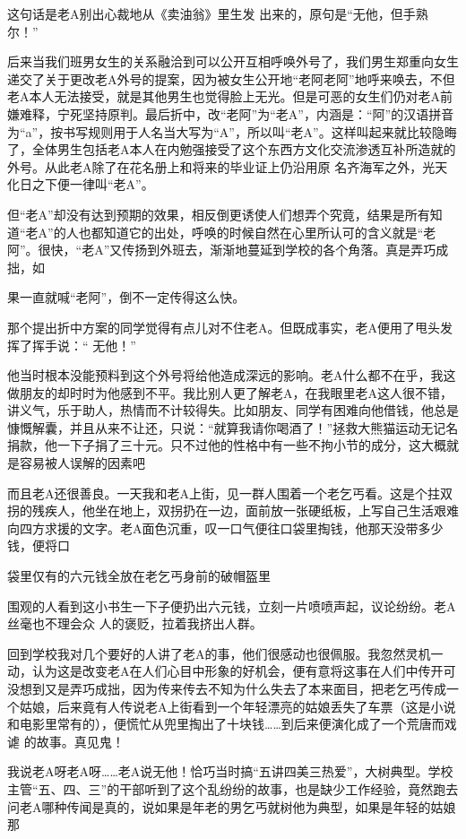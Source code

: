 \documentclass{article}
\begin{document}
这句话是老A别出心裁地从《卖油翁》里生发
出来的，原句是“无他，但手熟尔！” 

后来当我们班男女生的关系融洽到可以公开互相呼唤外号了，我们男生郑重向女生递交了关于更改老A外号的提案，因为被女生公开地“老阿老阿”地呼来唤去，不但老A本人无法接受，就是其他男生也觉得脸上无光。但是可恶的女生们仍对老A前嫌难释，宁死坚持原判。最后折中，改“老阿”为“老A”，内涵是：“阿”的汉语拼音为“a”，按书写规则用于人名当大写为“A”，所以叫“老A”。这样叫起来就比较隐晦了，全体男生包括老A本人在内勉强接受了这个东西方文化交流渗透互补所造就的外号。从此老A除了在花名册上和将来的毕业证上仍沿用原
名齐海军之外，光天化日之下便一律叫“老A”。 

但“老A”却没有达到预期的效果，相反倒更诱使人们想弄个究竟，结果是所有知道“老A”的人也都知道它的出处，呼唤的时候自然在心里所认可的含义就是“老阿”。很快，“老A”又传扬到外班去，渐渐地蔓延到学校的各个角落。真是弄巧成拙，如
\newpage

果一直就喊“老阿”，倒不一定传得这么快。 

那个提出折中方案的同学觉得有点儿对不住老A。但既成事实，老A便用了甩头发挥了挥手说：“
无他！” 

他当时根本没能预料到这个外号将给他造成深远的影响。老A什么都不在乎，我这做朋友的却时时为他感到不平。我比别人更了解老A，在我眼里老A这人很不错，讲义气，乐于助人，热情而不计较得失。比如朋友、同学有困难向他借钱，他总是慷慨解囊，并且从来不让还，只说：“就算我请你喝酒了！”拯救大熊猫运动无记名捐款，他一下子捐了三十元。只不过他的性格中有一些不拘小节的成分，这大概就
是容易被人误解的因素吧 

而且老A还很善良。一天我和老A上街，见一群人围着一个老乞丐看。这是个拄双拐的残疾人，他坐在地上，双拐扔在一边，面前放一张硬纸板，上写自己生活艰难向四方求援的文字。老A面色沉重，叹一口气便往口袋里掏钱，他那天没带多少钱，便将口
\newpage

袋里仅有的六元钱全放在老乞丐身前的破帽盔里 

围观的人看到这小书生一下子便扔出六元钱，立刻一片喷喷声起，议论纷纷。老A丝毫也不理会众
人的褒贬，拉着我挤出人群。 

回到学校我对几个要好的人讲了老A的事，他们很感动也很佩服。我忽然灵机一动，认为这是改变老A在人们心目中形象的好机会，便有意将这事在人们中传开可没想到又是弄巧成拙，因为传来传去不知为什么失去了本来面目，把老乞丐传成一个姑娘，后来竟有人传说老A上街看到一个年轻漂亮的姑娘丢失了车票（这是小说和电影里常有的），便慌忙从兜里掏出了十块钱……到后来便演化成了一个荒唐而戏谑
的故事。真见鬼！ 

我说老A呀老A呀……老A说无他！恰巧当时搞“五讲四美三热爱”，大树典型。学校主管“五、四、三”的干部听到了这个乱纷纷的故事，也是缺少工作经验，竟然跑去问老A哪种传闻是真的，说如果是年老的男乞丐就树他为典型，如果是年轻的姑娘那
\newpage
\end{document}
